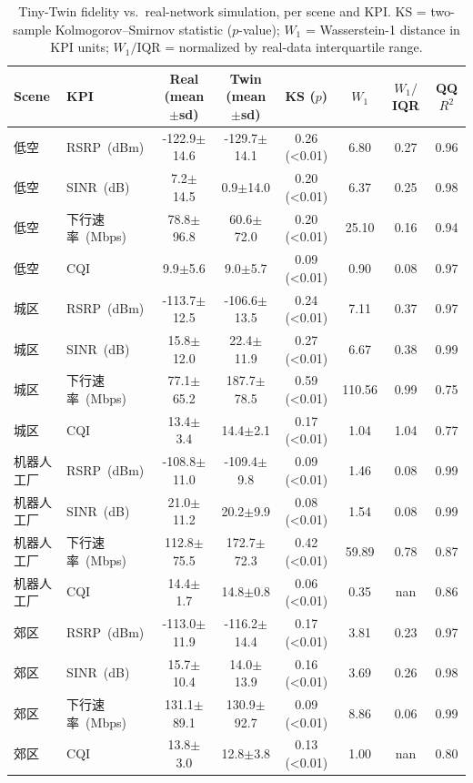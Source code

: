\begin{table}[t]
\centering
\caption{Tiny-Twin fidelity vs.\ real-network simulation, per scene and KPI. KS = two-sample Kolmogorov--Smirnov statistic ($p$-value); $W_1$ = Wasserstein-1 distance in KPI units; $W_1/\mathrm{IQR}$ = normalized by real-data interquartile range.}
\label{tab:fidelity}
\small
\begin{tabular}{llcccccc}
\toprule
Scene & KPI & Real (mean$\pm$sd) & Twin (mean$\pm$sd) & KS ($p$) & $W_1$ & $W_1/$IQR & QQ $R^2$ \\
\midrule
低空 & RSRP~(dBm) & -122.9$\pm$14.6 & -129.7$\pm$14.1 & 0.26 (<0.01) & 6.80 & 0.27 & 0.96 \\
低空 & SINR~(dB) & 7.2$\pm$14.5 & 0.9$\pm$14.0 & 0.20 (<0.01) & 6.37 & 0.25 & 0.98 \\
低空 & 下行速率~(Mbps) & 78.8$\pm$96.8 & 60.6$\pm$72.0 & 0.20 (<0.01) & 25.10 & 0.16 & 0.94 \\
低空 & CQI & 9.9$\pm$5.6 & 9.0$\pm$5.7 & 0.09 (<0.01) & 0.90 & 0.08 & 0.97 \\
城区 & RSRP~(dBm) & -113.7$\pm$12.5 & -106.6$\pm$13.5 & 0.24 (<0.01) & 7.11 & 0.37 & 0.97 \\
城区 & SINR~(dB) & 15.8$\pm$12.0 & 22.4$\pm$11.9 & 0.27 (<0.01) & 6.67 & 0.38 & 0.99 \\
城区 & 下行速率~(Mbps) & 77.1$\pm$65.2 & 187.7$\pm$78.5 & 0.59 (<0.01) & 110.56 & 0.99 & 0.75 \\
城区 & CQI & 13.4$\pm$3.4 & 14.4$\pm$2.1 & 0.17 (<0.01) & 1.04 & 1.04 & 0.77 \\
机器人工厂 & RSRP~(dBm) & -108.8$\pm$11.0 & -109.4$\pm$9.8 & 0.09 (<0.01) & 1.46 & 0.08 & 0.99 \\
机器人工厂 & SINR~(dB) & 21.0$\pm$11.2 & 20.2$\pm$9.9 & 0.08 (<0.01) & 1.54 & 0.08 & 0.99 \\
机器人工厂 & 下行速率~(Mbps) & 112.8$\pm$75.5 & 172.7$\pm$72.3 & 0.42 (<0.01) & 59.89 & 0.78 & 0.87 \\
机器人工厂 & CQI & 14.4$\pm$1.7 & 14.8$\pm$0.8 & 0.06 (<0.01) & 0.35 & nan & 0.86 \\
郊区 & RSRP~(dBm) & -113.0$\pm$11.9 & -116.2$\pm$14.4 & 0.17 (<0.01) & 3.81 & 0.23 & 0.97 \\
郊区 & SINR~(dB) & 15.7$\pm$10.4 & 14.0$\pm$13.9 & 0.16 (<0.01) & 3.69 & 0.26 & 0.98 \\
郊区 & 下行速率~(Mbps) & 131.1$\pm$89.1 & 130.9$\pm$92.7 & 0.09 (<0.01) & 8.86 & 0.06 & 0.99 \\
郊区 & CQI & 13.8$\pm$3.0 & 12.8$\pm$3.8 & 0.13 (<0.01) & 1.00 & nan & 0.80 \\
\bottomrule
\end{tabular}
\end{table}
